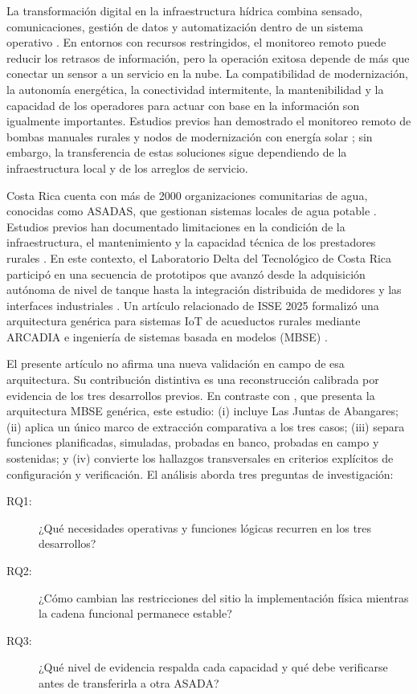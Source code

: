 \documentclass[conference]{IEEEtran}
\begin{document}
La transformación digital en la infraestructura hídrica combina sensado, comunicaciones, gestión de datos y automatización dentro de un sistema operativo \cite{arnell2023making,zulkifli2022iot,velayudhan2022iot}. En entornos con recursos restringidos, el monitoreo remoto puede reducir los retrasos de información, pero la operación exitosa depende de más que conectar un sensor a un servicio en la nube. La compatibilidad de modernización, la autonomía energética, la conectividad intermitente, la mantenibilidad y la capacidad de los operadores para actuar con base en la información son igualmente importantes. Estudios previos han demostrado el monitoreo remoto de bombas manuales rurales y nodos de modernización con energía solar \cite{thomson2012gsm,bawankar2024iot}; sin embargo, la transferencia de estas soluciones sigue dependiendo de la infraestructura local y de los arreglos de servicio.

Costa Rica cuenta con más de 2000 organizaciones comunitarias de agua, conocidas como ASADAS, que gestionan sistemas locales de agua potable \cite{direccion2025asadas}. Estudios previos han documentado limitaciones en la condición de la infraestructura, el mantenimiento y la capacidad técnica de los prestadores rurales \cite{soto2016situacion,gaviria2020risk}. En este contexto, el Laboratorio Delta del Tecnológico de Costa Rica participó en una secuencia de prototipos que avanzó desde la adquisición autónoma de nivel de tanque hasta la integración distribuida de medidores y las interfaces industriales \cite{chavarria2021implementacion,solorzano2021sistema,oviedo2024desarrollo}. Un artículo relacionado de ISSE 2025 formalizó una arquitectura genérica para sistemas IoT de acueductos rurales mediante ARCADIA e ingeniería de sistemas basada en modelos (MBSE) \cite{arguedas2025towards}.

El presente artículo no afirma una nueva validación en campo de esa arquitectura. Su contribución distintiva es una reconstrucción calibrada por evidencia de los tres desarrollos previos. En contraste con \cite{arguedas2025towards}, que presenta la arquitectura MBSE genérica, este estudio: (i) incluye Las Juntas de Abangares; (ii) aplica un único marco de extracción comparativa a los tres casos; (iii) separa funciones planificadas, simuladas, probadas en banco, probadas en campo y sostenidas; y (iv) convierte los hallazgos transversales en criterios explícitos de configuración y verificación. El análisis aborda tres preguntas de investigación:

\begin{description}
\item[RQ1:] ¿Qué necesidades operativas y funciones lógicas recurren en los tres desarrollos?
\item[RQ2:] ¿Cómo cambian las restricciones del sitio la implementación física mientras la cadena funcional permanece estable?
\item[RQ3:] ¿Qué nivel de evidencia respalda cada capacidad y qué debe verificarse antes de transferirla a otra ASADA?
\end{description}
\end{document}
